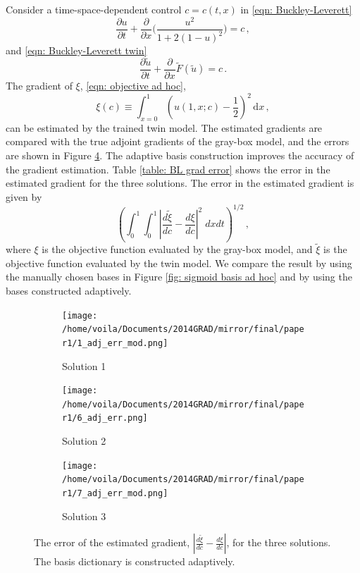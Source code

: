 Consider a time-space-dependent control $c=c(t,x)$ in \eqref{eqn: Buckley-Leverett} 
\begin{equation*}
    \frac{\partial u}{\partial t} + \frac{\partial}{\partial x}\Big(
    \frac{u^2}{1+ 2(1-u)^2} \Big) = c\,,
\end{equation*}
and 
\eqref{eqn: Buckley-Leverett twin}
\begin{equation*}
    \frac{\partial \tilde{u}}{\partial t} + \frac{\partial}{\partial x}\tilde{F}(\tilde{u})
    = c\,.
\end{equation*}
The gradient of $\xi$, \eqref{eqn: objective ad hoc}, 
\begin{equation*}
    \xi(c) \equiv \int_{x=0}^1 \left(u(1,x; c) - \frac{1}{2}\right)^2 \,\textrm{d}x\,,
\end{equation*}
can be estimated by the trained twin model. The estimated gradients are compared with the true adjoint
gradients of the gray-box model, and the errors are shown in Figure \ref{fig: adap basis grad err BL}.
The adaptive basis construction improves the accuracy of the gradient estimation.
Table \ref{table: BL grad error} shows the error in the estimated gradient for
the three solutions.
The error in the estimated gradient is given by
\begin{equation*}
    \left(\int_0^1 \int_0^1 \left|\frac{d\tilde{\xi}}{dc} -\frac{d\xi}{dc} \right|^2 \; dxdt\right)^{1/2}\,,
\end{equation*}
where $\xi$ is the objective function evaluated by the gray-box model, and 
$\tilde{\xi}$ is the objective function evaluated by the twin model.
We compare the result by using the manually chosen bases in Figure
\ref{fig: sigmoid basis ad hoc} and by using the bases constructed adaptively.\\

\begin{figure}[htbp]\begin{center}
    \begin{subfigure}[t]{.32\textwidth}
        \centering
        \texttt{[image: /home/voila/Documents/2014GRAD/mirror/final/paper1/1\_adj\_err\_mod.png]}
        \caption{Solution 1}
        \label{fig: grad BL 1}
    \end{subfigure}
    \begin{subfigure}[t]{.32\textwidth}     
        \centering
        \texttt{[image: /home/voila/Documents/2014GRAD/mirror/final/paper1/6\_adj\_err.png]}
        \caption{Solution 2}
        \label{fig: grad BL 2}
    \end{subfigure}
    \begin{subfigure}[t]{.32\textwidth}
        \centering
        \texttt{[image: /home/voila/Documents/2014GRAD/mirror/final/paper1/7\_adj\_err\_mod.png]}
        \caption{Solution 3}
        \label{fig: grad BL 3}
    \end{subfigure}
    \caption{The error of the estimated gradient, $\left|\frac{d\tilde{\xi}}{dc} - \frac{d\xi}{dc}
             \right|$, for the three solutions. The basis dictionary is constructed adaptively.}
    \label{fig: adap basis grad err BL}
\end{center}\end{figure}


